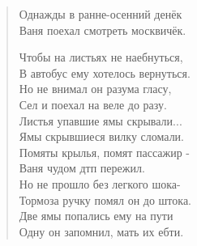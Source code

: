 \documentclass[a5paper,10pt]{article}\usepackage[usenames,dvipsnames]{color}\usepackage{extsizes,cmap,graphicx,misccorr,indentfirst,makecell,multirow,ulem,geometry,amssymb,amsfonts,amsmath,amsthm,titlesec,float,fancyhdr,wrapfig,tikz,pgfplots}\usepackage[T2A]{fontenc}\usepackage[utf8x]{inputenc}\usepackage[english, russian]{babel}\usetikzlibrary{decorations.pathreplacing,decorations.pathmorphing,patterns,calc,scopes,arrows,through,positioning,shapes.misc}\graphicspath{{img/}}\linespread{1.3}\frenchspacing\geometry{left=1cm, right=1cm, top=2cm, bottom=1cm, bindingoffset=0cm}\pagestyle{fancy}\fancyhead{}\fancyhead[R]{Сарафанов Ф.Г.}
\begin{document}
\begin{center}
   \begin{verse}
Однажды в ранне-осенний денёк\\
Ваня поехал смотреть москвичёк.\\
\smallskip
\smallskip

Чтобы на листьях не наебнуться,\\
В автобус ему хотелось вернуться.\\
\smallskip
\smallskip
Но не внимал он разума гласу,\\
Сел и поехал на веле до разу.\\
\smallskip
\smallskip
Листья упавшие ямы скрывали...\\
Ямы скрывшиеся вилку сломали.\\
\smallskip
\smallskip
Помяты крылья, помят пассажир - \\
Ваня чудом дтп пережил.\\
Но не прошло без легкого шока-\\
Тормоза ручку помял он до штока.\\
Две ямы попались ему на пути\\
Одну он запомнил, мать их ебти.\\


\end{verse} 
\end{center}
\end{document}
